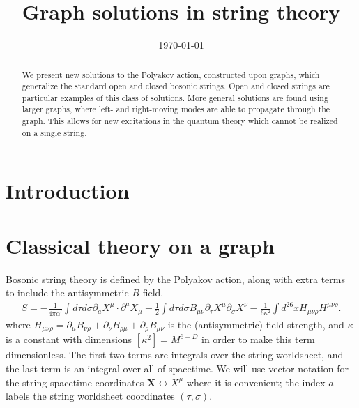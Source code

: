 \documentclass{revtex4}
\newcommand{\be}{\begin{eqnarray}}
\newcommand{\ee}{\end{eqnarray}}
\def\X{\bm{X}}
\begin{document}

\title{Graph solutions in string theory}
\date{\today}

\begin{abstract}
We present new solutions to the Polyakov action, constructed upon graphs, which generalize the standard open and closed bosonic strings. Open and closed strings are particular examples of this class of solutions. More general solutions are found using larger graphs, where left- and right-moving modes are able to propagate through the graph. This allows for new excitations in the quantum theory which cannot be realized on a single string.
\end{abstract}

\maketitle


\section{Introduction}


\section{Classical theory on a graph}
\label{sec: classical}

Bosonic string theory is defined by the Polyakov action, along with extra terms to include the antisymmetric $B$-field.
\be
\label{poly action}
S = - \frac{1}{4 \pi \alpha^\prime} \int d\tau d\sigma \partial_a X^\mu \cdot \partial^a X_\mu 
- \frac{1}{2} \int d\tau d\sigma B_{\mu \nu} \partial_\tau X^\mu \partial_\sigma X^\nu
- \frac{1}{6 \kappa^2} \int d^{26} x H_{\mu \nu \rho} H^{\mu \nu \rho} .
\ee
where $H_{\mu \nu \rho} = \partial_\mu B_{\nu \rho} +  \partial_\nu B_{\rho \mu}+ \partial_\rho B_{\mu \nu}$ is the (antisymmetric) field strength, and $\kappa$ is a constant with dimensions $[\kappa^2] = M^{6-D}$ in order to make this term dimensionless. The first two terms are integrals over the string worldsheet, and the last term is an integral over all of spacetime.
We will use vector notation for the string spacetime coordinates $\X \leftrightarrow X^\mu$ where it is convenient; the index $a$ labels the string worldsheet coordinates $(\tau, \sigma)$.
\end{document}
